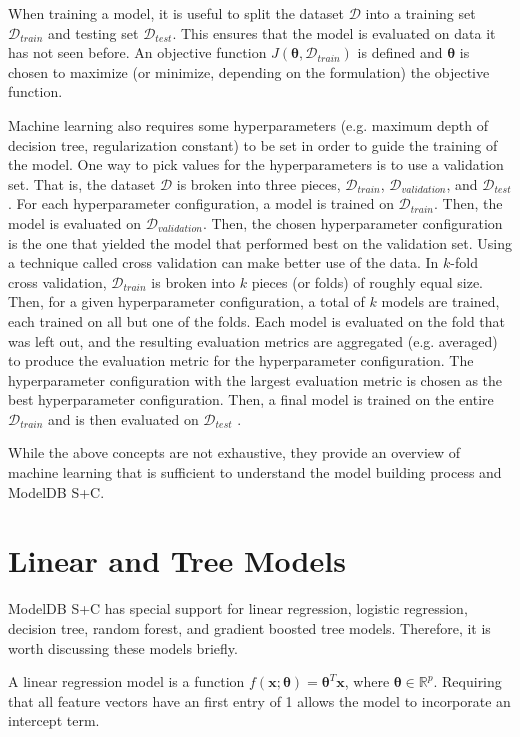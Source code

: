 When training a model, it is useful to split the dataset $\mathcal{D}$ into
a training set $\mathcal{D}_{train}$ and testing set $\mathcal{D}_{test}$. This ensures
that the model is evaluated on data it has not seen before. An objective function
$J(\boldsymbol{\theta}, \mathcal{D}_{train})$ is defined and $\boldsymbol{\theta}$ 
is chosen to maximize (or minimize, depending on the formulation) the objective function.

Machine learning also requires some hyperparameters (e.g. maximum depth of decision tree, regularization constant) 
to be set in order to guide the training of the model. One way to pick values for the hyperparameters
is to use a validation set. That is, the dataset $\mathcal{D}$ is broken into three pieces, 
$\mathcal{D}_{train}$, $\mathcal{D}_{validation}$, and $\mathcal{D}_{test}$. For each 
hyperparameter configuration, a model is trained on $\mathcal{D}_{train}$. Then, the model
is evaluated on $\mathcal{D}_{validation}$. Then, the chosen hyperparameter configuration
is the one that yielded the model that performed best on the validation set. 
Using a technique called cross validation can make better use of the data. In 
$k$-fold cross validation, $\mathcal{D}_{train}$ is broken into $k$ pieces (or folds) of roughly
equal size. Then, for a given hyperparameter configuration, a total of $k$ models are trained, each 
trained on all but one of the folds. Each model is evaluated on the fold that was left out,
and the resulting evaluation metrics are aggregated (e.g. averaged) to produce the evaluation
metric for the hyperparameter configuration. The hyperparameter configuration with the
largest evaluation metric is chosen as the best hyperparameter configuration. Then, a final
model is trained on the entire $\mathcal{D}_{train}$ and is then evaluated on $\mathcal{D}_{test}$ 
\cite{deeplearningbook}.

While the above concepts are not exhaustive, they provide an overview of machine learning that is sufficient to
understand the model building process and ModelDB S+C.

\section{Linear and Tree Models}
ModelDB S+C has special support for linear regression, logistic regression, 
decision tree, random forest, and gradient boosted tree models. Therefore, it is worth discussing
these models briefly.

A linear regression model is a function $f(\textbf{x}; \boldsymbol{\theta}) = \boldsymbol{\theta}^{T}\textbf{x}$,
where $\boldsymbol{\theta} \in \mathbb{R}^{p}$. Requiring that all feature vectors have an first entry of 
1 allows the model to incorporate an intercept term.

